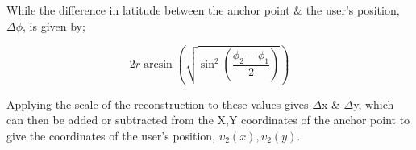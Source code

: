 While the difference in latitude between the anchor point \& the user's position, $\Delta\phi$, is given by;

\begin{equation}
2r \arcsin\left( \sqrt{\sin^{2} \left( \frac{\phi_{2} - \phi_{1}}{2}\right)} \right)
\end{equation}

Applying the scale of the reconstruction to these values gives $\Delta$x \& $\Delta$y, which can then be added or subtracted from the X,Y coordinates of the anchor point to give the coordinates of the user's position, $\upsilon_{2}(x),\upsilon_{2}(y)$.




